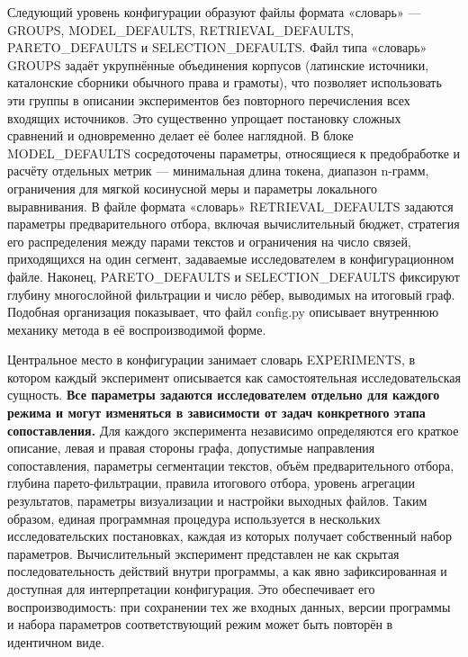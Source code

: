 Следующий уровень конфигурации образуют файлы формата «словарь» --- GROUPS, MODEL\_DEFAULTS, RETRIEVAL\_DEFAULTS, PARETO\_DEFAULTS и SELECTION\_DEFAULTS. Файл типа «словарь» GROUPS задаёт укрупнённые объединения корпусов (латинские источники, каталонские сборники обычного права и грамоты), что позволяет использовать эти группы в описании экспериментов без повторного перечисления всех входящих источников. Это существенно упрощает постановку сложных сравнений и одновременно делает её более наглядной. В блоке MODEL\_DEFAULTS сосредоточены параметры, относящиеся к предобработке и расчёту отдельных метрик --- минимальная длина токена, диапазон n-грамм, ограничения для мягкой косинусной меры и параметры локального выравнивания. В файле формата «словарь» RETRIEVAL\_DEFAULTS задаются параметры предварительного отбора, включая вычислительный бюджет, стратегия его распределения между парами текстов и ограничения на число связей, приходящихся на один сегмент, задаваемые исследователем в конфигурационном файле. Наконец, PARETO\_DEFAULTS и SELECTION\_DEFAULTS фиксируют глубину многослойной фильтрации и число рёбер, выводимых на итоговый граф. Подобная организация показывает, что файл config.py описывает внутреннюю механику метода в её воспроизводимой форме.

Центральное место в конфигурации занимает словарь EXPERIMENTS, в котором каждый эксперимент описывается как самостоятельная исследовательская сущность. \textbf{Все параметры задаются исследователем отдельно для каждого режима и могут изменяться в зависимости от задач конкретного этапа сопоставления.} Для каждого эксперимента независимо определяются его краткое описание, левая и правая стороны графа, допустимые направления сопоставления, параметры сегментации текстов, объём предварительного отбора, глубина парето-фильтрации, правила итогового отбора, уровень агрегации результатов, параметры визуализации и настройки выходных файлов. Таким образом, единая программная процедура используется в нескольких исследовательских постановках, каждая из которых получает собственный набор параметров. Вычислительный эксперимент представлен не как скрытая последовательность действий внутри программы, а как явно зафиксированная и доступная для интерпретации конфигурация. Это обеспечивает его воспроизводимость: при сохранении тех же входных данных, версии программы и набора параметров соответствующий режим может быть повторён в идентичном виде.

